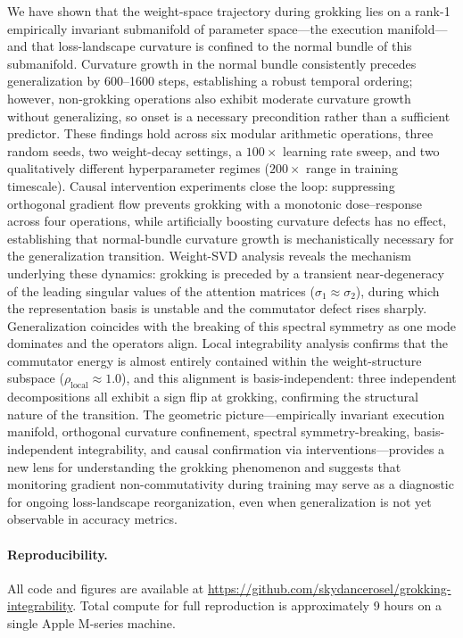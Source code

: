 \documentclass[11pt]{article}
\begin{document}
We have shown that the weight-space trajectory during grokking lies on a rank-1 empirically invariant submanifold of parameter space---the execution manifold---and that loss-landscape curvature is confined to the normal bundle of this submanifold.
Curvature growth in the normal bundle consistently precedes generalization by 600--1600 steps, establishing a robust temporal ordering; however, non-grokking operations also exhibit moderate curvature growth without generalizing, so onset is a necessary precondition rather than a sufficient predictor.
These findings hold across six modular arithmetic operations, three random seeds, two weight-decay settings, a $100\times$ learning rate sweep, and two qualitatively different hyperparameter regimes ($200\times$ range in training timescale).
Causal intervention experiments close the loop: suppressing orthogonal gradient flow prevents grokking with a monotonic dose--response across four operations, while artificially boosting curvature defects has no effect, establishing that normal-bundle curvature growth is mechanistically necessary for the generalization transition.
Weight-SVD analysis reveals the mechanism underlying these dynamics: grokking is preceded by a transient near-degeneracy of the leading singular values of the attention matrices ($\sigma_1 \approx \sigma_2$), during which the representation basis is unstable and the commutator defect rises sharply.
Generalization coincides with the breaking of this spectral symmetry as one mode dominates and the operators align.
Local integrability analysis confirms that the commutator energy is almost entirely contained within the weight-structure subspace ($\rho_{\mathrm{local}} \approx 1.0$), and this alignment is basis-independent: three independent decompositions all exhibit a sign flip at grokking, confirming the structural nature of the transition.
The geometric picture---empirically invariant execution manifold, orthogonal curvature confinement, spectral symmetry-breaking, basis-independent integrability, and causal confirmation via interventions---provides a new lens for understanding the grokking phenomenon and suggests that monitoring gradient non-commutativity during training may serve as a diagnostic for ongoing loss-landscape reorganization, even when generalization is not yet observable in accuracy metrics.

\paragraph{Reproducibility.}
All code and figures are available at \url{https://github.com/skydancerosel/grokking-integrability}.
Total compute for full reproduction is approximately 9 hours on a single Apple M-series machine.
\end{document}
